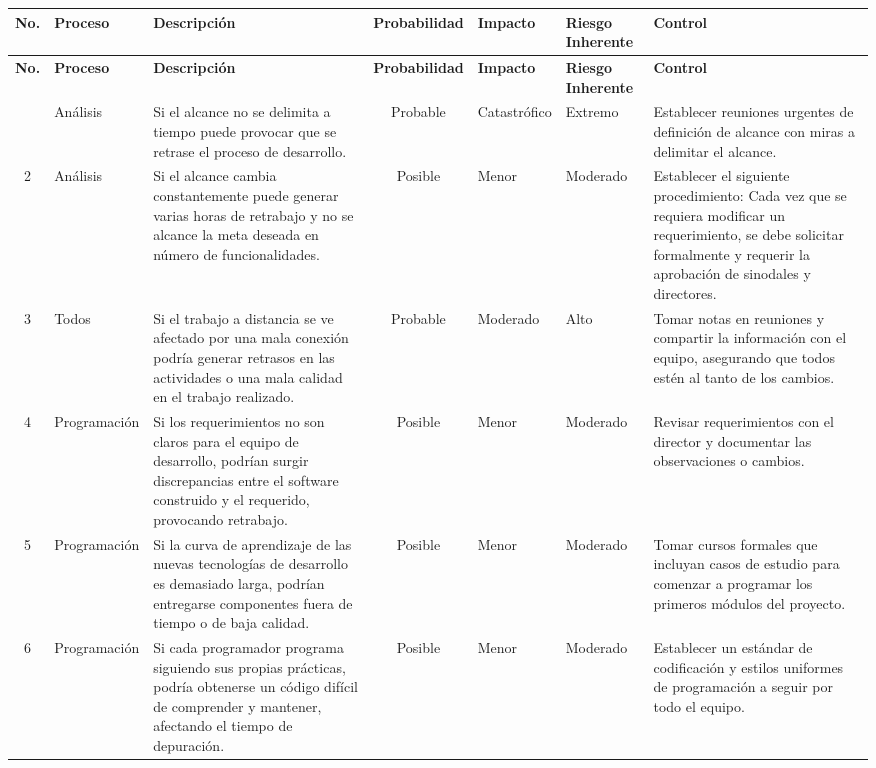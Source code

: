 	\begin{longtable}{|c|p{2cm}|p{3cm}|c|p{2cm}|p{2cm}|p{3cm}|}
		\hline
		\textbf{No.} & \textbf{Proceso} & \textbf{Descripción} & \textbf{Probabilidad} & \textbf{Impacto} & \textbf{Riesgo Inherente} & \textbf{Control} \\ \hline
		\endfirsthead
		\hline
		\textbf{No.} & \textbf{Proceso} & \textbf{Descripción} & \textbf{Probabilidad} & \textbf{Impacto} & \textbf{Riesgo Inherente} & \textbf{Control} \\ \hline
		\endhead
		\hline
		\endfoot
		\endlastfoot
		1 & Análisis & Si el alcance no se delimita a tiempo puede provocar que se retrase el proceso de desarrollo. & Probable & Catastrófico & Extremo & Establecer reuniones urgentes de definición de alcance con miras a delimitar el alcance. \\ \hline
		2 & Análisis & Si el alcance cambia constantemente puede generar varias horas de retrabajo y no se alcance la meta deseada en número de funcionalidades. & Posible & Menor & Moderado & Establecer el siguiente procedimiento: Cada vez que se requiera modificar un requerimiento, se debe solicitar formalmente y requerir la aprobación de sinodales y directores. \\ \hline
		3 & Todos & Si el trabajo a distancia se ve afectado por una mala conexión podría generar retrasos en las actividades o una mala calidad en el trabajo realizado. & Probable & Moderado & Alto & Tomar notas en reuniones y compartir la información con el equipo, asegurando que todos estén al tanto de los cambios. \\ \hline
		4 & Programación & Si los requerimientos no son claros para el equipo de desarrollo, podrían surgir discrepancias entre el software construido y el requerido, provocando retrabajo. & Posible & Menor & Moderado & Revisar requerimientos con el director y documentar las observaciones o cambios. \\ \hline
		5 & Programación & Si la curva de aprendizaje de las nuevas tecnologías de desarrollo es demasiado larga, podrían entregarse componentes fuera de tiempo o de baja calidad. & Posible & Menor & Moderado & Tomar cursos formales que incluyan casos de estudio para comenzar a programar los primeros módulos del proyecto. \\ \hline
		6 & Programación & Si cada programador programa siguiendo sus propias prácticas, podría obtenerse un código difícil de comprender y mantener, afectando el tiempo de depuración. & Posible & Menor & Moderado & Establecer un estándar de codificación y estilos uniformes de programación a seguir por todo el equipo. \\ \hline

\end{longtable}
